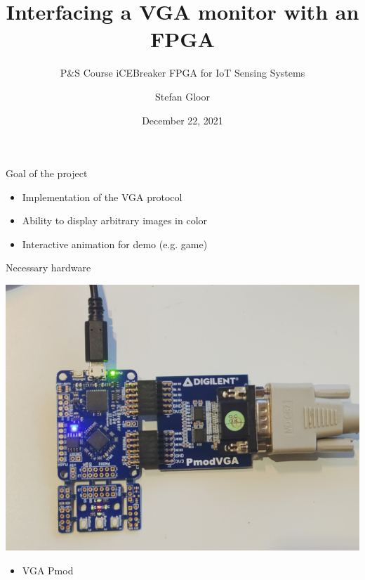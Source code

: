 \documentclass{beamer}
\title{Interfacing a VGA monitor with an FPGA}
\subtitle{P\&S Course iCEBreaker FPGA for IoT Sensing Systems}
\institute{ETH Zürich}
\author{Stefan Gloor}
\date{December 22, 2021}
\begin{document}
\begin{frame}
	\titlepage
\end{frame}

\begin{frame}{Goal of the project}
	\begin{itemize}
		\item Implementation of the VGA protocol
		\item Ability to display arbitrary images in color
		\item Interactive animation for demo (e.g. game)
	\end{itemize}
\end{frame}

\begin{frame}{Necessary hardware}
	\begin{minipage}{0.49\textwidth}
	\includegraphics[width=\textwidth]{../hardware.jpg}
	\end{minipage}
	\begin{minipage}{0.49\textwidth}
		\begin{itemize}
			\item VGA Pmod
		\end{itemize}
	\end{minipage}
\end{frame}
\end{document}

